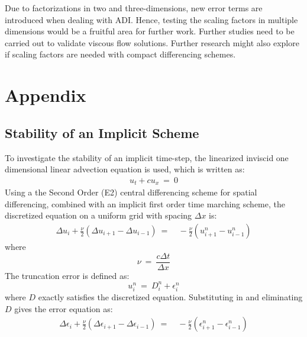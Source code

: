 \documentclass[conf]{new-aiaa}
\begin{document}
Due to factorizations in two and three-dimensions, new error terms are introduced when dealing with ADI. 
Hence, testing the scaling factors in multiple dimensions would be a fruitful area for further work. 
Further studies need to be carried out to validate viscous flow solutions. 
Further research might also explore if scaling factors are needed with compact differencing schemes. 

\section{Appendix}
\subsection{Stability of an Implicit Scheme}
{
{\label{Sec:Appendix:Stability_Fourier}
To investigate the stability of an implicit time-step, the linearized inviscid one dimensional linear advection equation is used, which is written as:
\begin{equation}
	\begin{split}
		\label{eq:LAE_Simple_Version}
  			u_t+cu_x~=~0
	\end{split}
\end{equation}
Using a the Second Order (E2) central differencing scheme for spatial differencing, combined with an implicit first order time marching scheme, the discretized equation on a uniform grid with spacing $\Delta{x}$ is:
\begin{equation}
	\begin{split}
		\label{eq:LAE_RDRP}
  			\Delta{u_i}+\frac{\nu}{2}\left(\Delta{u_{i+1}}-\Delta{u_{i-1}}\right) ~=&~-\frac{\nu}{2}\left(u^n_{i+1}-u^n_{i-1}\right)
	\end{split}
\end{equation}
where
\begin{equation*}
	\nu~=~\frac{c\Delta{t}}{\Delta{x}}
\end{equation*}
The truncation error is defined as:
\begin{equation*}
	u_i^n~=~D_i^n+\epsilon_i^n
\end{equation*}
where $D$ exactly satisfies the discretized equation. Substituting in and eliminating $D$ gives the error equation as:
\begin{equation}
	\begin{split}
		\label{eq:Error_Equation}
  			\Delta{\epsilon_i}+\frac{\nu}{2}\left(\Delta{\epsilon_{i+1}}-\Delta{\epsilon_{i-1}}\right) ~=&~-\frac{\nu}{2}\left(\epsilon^n_{i+1}-\epsilon^n_{i-1}\right)

\end{split}
\end{equation}}}
\end{document}
